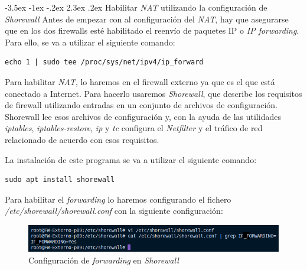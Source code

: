 \documentclass[11pt]{report}
\makeatletter
\renewcommand\chapter{\@startsection{chapter}{0}{\z@}%
    {-3.5ex \@plus -1ex \@minus -.2ex}%
    {2.3ex \@plus.2ex}%
    {\normalfont\Large\bfseries}}
\makeatother
\begin{document}
\cleardoublepage

\chapter{Habilitar \emph{NAT} utilizando la configuración de \emph{Shorewall}}
Antes de empezar con al configuración del \emph{NAT}, hay que asegurarse que en los dos firewalls esté
habilitado el reenvío de paquetes IP o \emph{IP forwarding}. Para ello, se va a utilizar el siguiente comando:
\begin{BVerbatim}
echo 1 | sudo tee /proc/sys/net/ipv4/ip_forward
\end{BVerbatim}


Para habilitar \emph{NAT}, lo haremos en el firewall externo ya que es el que está conectado 
a Internet. Para hacerlo usaremos \emph{Shorewall}, que describe los requisitos de firewall utilizando entradas en un 
conjunto de archivos de configuración. Shorewall lee esos archivos de configuración y, 
con la ayuda de las utilidades \emph{iptables}, \emph{iptables-restore}, \emph{ip} y \emph{tc} configura 
el \emph{Netfilter} y el tráfico de red relacionado de acuerdo con esos requisitos.

La instalación de este programa se va a utilizar el siguiente comando:
\begin{BVerbatim}
sudo apt install shorewall
\end{BVerbatim}

Para habilitar el \emph{forwarding} lo haremos configurando el
fichero \emph{/etc/shorewall/shorewall.conf} con la siguiente configuración:
\begin{figure}[H]
  \centering
  \includegraphics[scale=0.8]{img/forwarding_shorewall.png}
  \caption{Configuración de \emph{forwarding} en \emph{Shorewall}}
  \label{fig:Configuracion de forwarding en Shorewall}
\end{figure}
\end{document}
